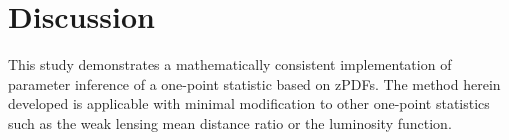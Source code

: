 \documentclass[preprint]{aastex}
\begin{document}
\section{Discussion}
\label{sec:disc}

This study demonstrates a mathematically consistent implementation of parameter inference of a one-point statistic based on zPDFs.  The method herein developed is applicable with minimal modification to other one-point statistics such as the weak lensing mean distance ratio or the luminosity function.






\end{document}
